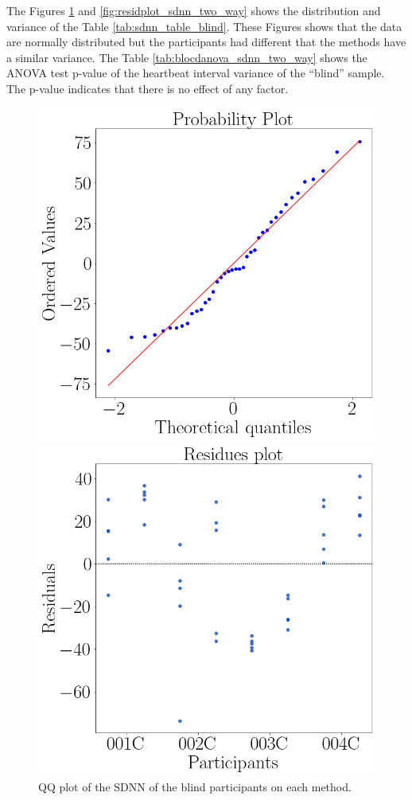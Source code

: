 The Figures \ref{fig:qqplot_sdnn_two_way} and \ref{fig:residplot_sdnn_two_way} shows the distribution and variance of the Table \ref{tab:sdnn_table_blind}. These Figures shows that the data are normally distributed but the participants had different  that the methods have a similar variance.
The Table \ref{tab:blocdanova_sdnn_two_way} shows the ANOVA test p-value of the heartbeat interval variance of the “blind” sample. The p-value indicates that there is no effect of any factor.



\begin{figure}[!htb]
    \centering
    \begin{minipage}{0.45\textwidth}
        \centering
        \includegraphics[width = 0.8\linewidth]{Resultados/ECG/Figuras/png/qqplot_sdnn_two_way.png}
        \caption{QQ plot of the SDNN of the blind participants on each method.}
        \label{fig:qqplot_sdnn_two_way}
    \end{minipage}
    \begin{minipage}{0.45\textwidth}
        \centering
        \includegraphics[width = 0.8\linewidth]{Resultados/ECG/Figuras/png/residplot_sdnn_two_way.png}

\end{minipage}
\end{figure}
